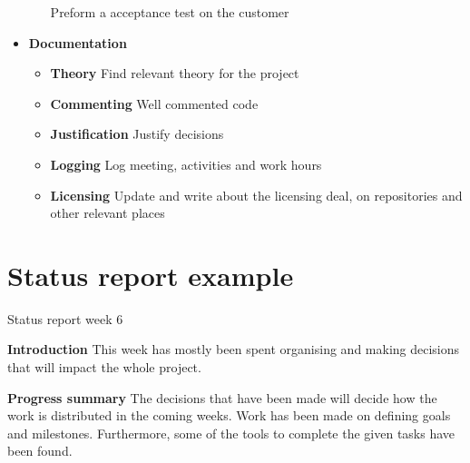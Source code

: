 \begin{appendices}
\begin{itemize}
\begin{itemize}
			Preform a acceptance test on the customer 
		\end{itemize}
	\item \textbf{Documentation}
		\begin{itemize}
			\item \textbf{Theory} \newline
			Find relevant theory for the project 
			\item \textbf{Commenting} \newline
			Well commented code 
			\item \textbf{Justification} \newline
			Justify decisions 
			\item \textbf{Logging} \newline
			Log meeting, activities and work hours
			\item \textbf{Licensing} \newline
			Update and write about the licensing deal, on repositories and other relevant places 
		\end{itemize}
\end{itemize}


\chapter{Status report example}
\label{app:status_report}

Status report week 6\newline


		\textbf{Introduction} \newline
		This week has mostly been spent organising and making decisions that will impact the whole project.\newline
		
		\textbf{Progress summary} \newline
		The decisions that have been made will decide how the work is distributed in the coming weeks. Work has been made on defining goals and milestones. Furthermore, some of the tools to complete the given tasks have been found.\newline
		

\end{appendices}
